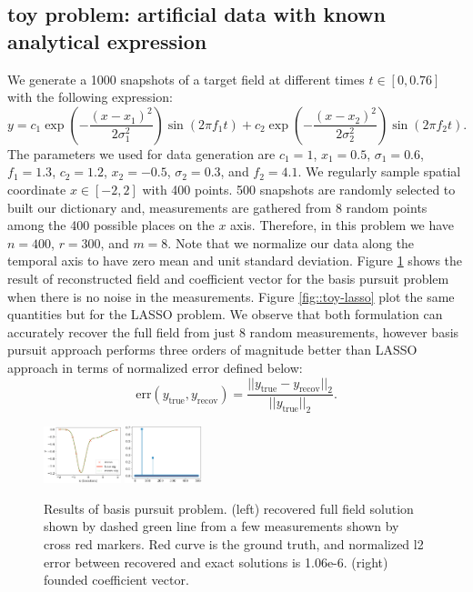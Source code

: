 \documentclass[conference]{IEEEtran}
\begin{document}
\subsection{toy problem: artificial data with known analytical expression}
We generate a 1000 snapshots of a target field at different times $t \in [0, 0.76]$ with the following expression:
\begin{equation}
y = c_1 \exp(-\frac{(x-x_1)^2}{2\sigma_1^2}) \sin(2\pi f_1 t)+
    c_2 \exp(-\frac{(x-x_2)^2}{2\sigma_2^2}) \sin(2\pi f_2 t).
\end{equation}
The parameters we used for data generation are $c_1=1$, $x_1=0.5$, $\sigma_1=0.6$, $f_1=1.3$, $c_2=1.2$, $x_2=-0.5$, $\sigma_2=0.3$, and $f_2=4.1$. We regularly sample spatial coordinate $x \in [-2, 2]$ with 400 points. 500 snapshots are randomly selected to built our dictionary and, measurements are gathered from 8 random points among the 400 possible places on the $x$ axis. Therefore, in this problem we have $n=400$, $r=300$, and $m=8$. Note that we normalize our data along the temporal axis to have zero mean and unit standard deviation. Figure \ref{fig::toy-l1} shows the result of reconstructed field and coefficient vector for the basis pursuit problem when there is no noise in the measurements. Figure \ref{fig::toy-lasso} plot the same quantities but for the LASSO problem. We observe that both formulation can accurately recover the full field from just 8 random measurements, however basis pursuit approach performs three orders of magnitude better than LASSO approach in terms of normalized error defined below:
\begin{equation}
\text{err}(y_{\text{true}}, y_{\text{recov}}) = \frac{||y_{\text{true}}- y_{\text{recov}} ||_2}{||y_{\text{true}}||_2}.
\end{equation} 


\begin{figure}[!ht]
  \centering
  \includegraphics[width=0.2\textwidth]{figure/toy_l1_sol.png}
  \hspace{0.01\textwidth}
  \includegraphics[width=0.2\textwidth]{figure/toy_l1_coeff.png}
  \caption{Results of basis pursuit problem. (left) recovered full field solution shown by dashed green line from a few measurements shown by cross red markers. Red curve is the ground truth, and normalized l2 error between recovered and exact solutions is 1.06e-6. (right) founded coefficient vector.}\label{fig::toy-l1}
\end{figure}
\end{document}
